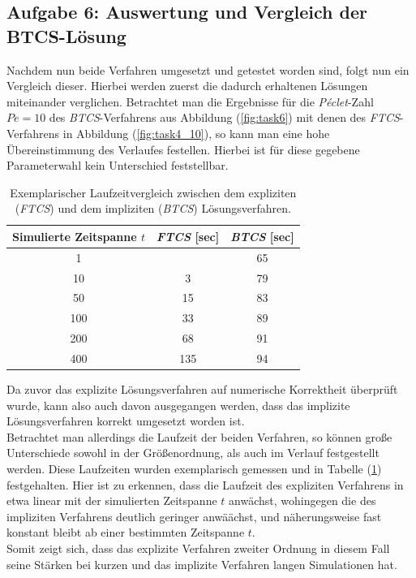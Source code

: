 \documentclass[12pt,a4paper,titlepage,headinclude,bibtotoc]{scrartcl}
\begin{document}
\subsection{Aufgabe 6: Auswertung und Vergleich der BTCS-Lösung}
\label{sec:disc_speed_comparison}
Nachdem nun beide Verfahren umgesetzt und getestet worden sind, folgt nun ein Vergleich dieser. Hierbei werden zuerst die dadurch erhaltenen Lösungen miteinander verglichen. Betrachtet man die Ergebnisse für die \textit{Péclet}-Zahl $Pe = 10$ des \textit{BTCS}-Verfahrens aus Abbildung (\ref{fig:task6}) mit denen des \textit{FTCS}-Verfahrens in Abbildung (\ref{fig:task4_10}), so kann man eine hohe Übereinstimmung des Verlaufes festellen. Hierbei ist für diese gegebene Parameterwahl kein Unterschied feststellbar.
\begin{table}[H]
	\centering
	\begin{tabular}{c|c|c}
		Simulierte Zeitspanne $t$ & \textit{FTCS} [sec] & \textit{BTCS} [sec] \\ 
		\hline  \hline 
		1 & \less 1 & 65 \\ 
		\hline 
		10 & 3 & 79 \\ 
		\hline 
		50 & 15 & 83 \\ 
		\hline 
		100 & 33 & 89 \\ 
		\hline 
		200 & 68 & 91 \\ 
		\hline 
		400 & 135 & 94 \\ 
		\hline 
	\end{tabular}
	\label{table:speed_comparison} 
	\caption{Exemplarischer Laufzeitvergleich zwischen dem expliziten (\textit{FTCS}) und dem impliziten (\textit{BTCS}) Lösungsverfahren.}
\end{table}
Da zuvor das explizite Lösungsverfahren auf numerische Korrektheit überprüft wurde, kann also auch davon ausgegangen werden, dass das implizite Lösungsverfahren korrekt umgesetzt worden ist.\\
Betrachtet man allerdings die Laufzeit der beiden Verfahren, so können große Unterschiede sowohl in der Größenordnung, als auch im Verlauf festgestellt werden. Diese Laufzeiten wurden exemplarisch gemessen und in Tabelle (\ref{table:speed_comparison}) festgehalten. Hier ist zu erkennen, dass die Laufzeit des expliziten Verfahrens in etwa linear mit der simulierten Zeitspanne $t$ anwächst, wohingegen die des impliziten Verfahrens deutlich geringer anwäächst, und näherungsweise fast konstant bleibt ab einer bestimmten Zeitspanne $t$.\\
Somit zeigt sich, dass das explizite Verfahren zweiter Ordnung in diesem Fall seine Stärken bei kurzen und das implizite Verfahren langen Simulationen hat.
\end{document}
